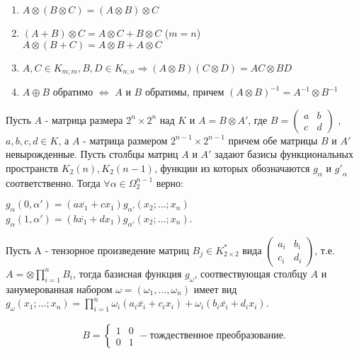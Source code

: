 \utv
\begin{enumerate}
    \item $A \otimes (B \otimes C) = (A \otimes B) \otimes C$
    \item $(A + B) \otimes C = A \otimes C + B \otimes C $ ($m = n$) \\
          $A \otimes (B + C) = A \otimes B + A \otimes C $
    \item $A,C  \in K_{m;m}, B,D \in K_{n;n} \Rightarrow (A \otimes B)(C \otimes D) = AC \otimes BD$
    \item $A \oplus B$ обратимо $\Leftrightarrow$ $A$ и $B$ обратимы, причем $(A \otimes B)^{-1} = A^{-1} \otimes B^{-1}$
\end{enumerate}

\lem Пусть $A$ - матрица размера $2^n \times 2^n$ над $K$ и $A = B \otimes A'$, где $B = \begin{pmatrix}
    a & b\\
    c & d
\end{pmatrix}$
, $a,b,c,d \in K$, а $A$ - матрица размером $2^{n-1} \times 2^{n-1}$ причем обе матрицы $B$ и  $A'$ невырожденные.
Пусть столбцы матриц $A$ и $A'$ задают базисы функциональных пространств $K_2(n), K_2(n-1)$, функции из которых обозначаются $g_\alpha$ и ${g'}_\alpha$ соответственно.
Тогда $\forall \alpha \in \Omega_2^{n-1}$ верно:

$g_\alpha(0, \alpha') = (a \overline{x_1} + c x_1)g_{\alpha'}(x_2; \dots ;x_n)$\\
$g_\alpha(1, \alpha') = (b \overline{x_1} + d x_1)g_{\alpha'}(x_2; \dots ;x_n)$.

\thr Пусть A - тензорное произведение матриц $B_j \in K_{2\times2}^*$ вида $\begin{pmatrix}
    a_i & b_i\\
    c_i & d_i
\end{pmatrix}$,
т.е. $A = \otimes \prod_{i = 1}^n B_i$, тогда базисная функция $g_\omega$, соотвествующая столбцу $A$ и занумерованная набором $\omega = (\omega_1, \dots, \omega_n)$ имеет вид
$g_\omega(x_1; \dots; x_n) = \prod_{i=1}^n \omega_i(a_i\overline{x_i} + c_ix_i) + \omega_i(b_i\overline{x_i} + d_ix_i)$.

\example
\begin{align*}
    B = 
    \begin{cases}
        1 & 0\\
        0 & 1
    \end{cases}
    - \text{тождественное преобразование}.
\end{align*}

